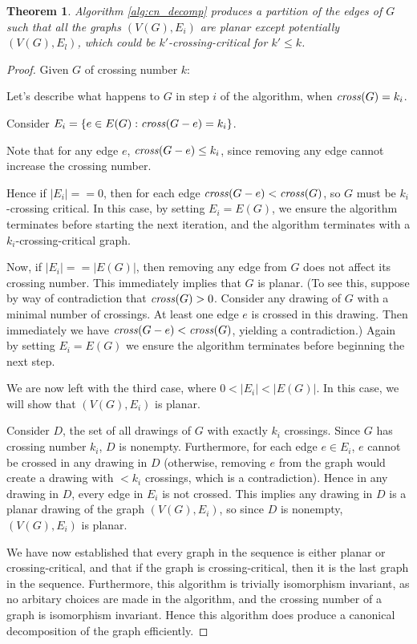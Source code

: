 \documentclass[11pt]{report}
\newtheorem{thm}{Theorem}
\newcommand{\cross}{\mbox{\emph{cross}}}
\begin{document}
\begin{thm}{Algorithm \ref{alg:cn_decomp} produces a partition of the edges of $G$ such that all the graphs $(V(G), E_i)$ are planar except potentially $(V(G), E_l)$, which could be $k'$-crossing-critical for $k'\leq k$}.

\end{thm}
\begin{proof}

Given $G$ of crossing number $k$:

Let's describe what happens to $G$ in step $i$ of the algorithm, when $\cross(G)=k_i$.

Consider $E_i= \{e\in E(G) : \cross(G-e) =k_i\}$.

Note that for any edge $e$, $\cross(G-e)\leq k_i$, since removing any edge cannot increase the crossing number.

Hence if $|E_i| ==0$, then for each edge $\cross(G-e)<\cross(G)$, so $G$ must be $k_i$-crossing critical. In this case, by setting $E_i = E(G)$, we ensure the algorithm terminates before starting the next iteration, and the algorithm terminates with a $k_i$-crossing-critical graph.

Now, if $|E_i|==|E(G)|$, then removing any edge from $G$ does not affect its crossing number. This immediately implies that $G$ is planar. (To see this, suppose by way of contradiction that $\cross(G) >0$. Consider any drawing of $G$ with a minimal number of crossings. At least one edge $e$ is crossed in this drawing. Then immediately we have $\cross(G-e) < \cross(G)$, yielding a contradiction.)  Again by setting $E_i = E(G)$ we ensure the algorithm terminates before beginning the next step.

We are now left with the third case, where $0<|E_i|<|E(G)|$. In this case, we will show that $(V(G), E_i)$ is planar. 

Consider $D$, the set of all drawings of $G$ with exactly $k_i$ crossings. Since $G$ has crossing number $k_i$, $D$ is nonempty. Furthermore, for each edge $e \in E_i$, $e$ cannot be crossed in any drawing in $D$ (otherwise, removing $e$ from the graph would create a drawing with $<k_i$ crossings, which is a contradiction). Hence in any drawing in $D$, every edge in $E_i$ is not crossed. This implies any drawing in $D$ is a planar drawing of the graph $(V(G), E_i)$, so since $D$ is nonempty,  $(V(G), E_i)$ is planar.

We have now established that every graph in the sequence is either planar or crossing-critical, and that if the graph is crossing-critical, then it is the last graph in the sequence. Furthermore, this algorithm is trivially isomorphism invariant, as no arbitary choices are made in the algorithm, and the crossing number of a graph is isomorphism invariant. Hence this algorithm does produce a canonical decomposition of the graph efficiently. 


\end{proof}
\end{document}
